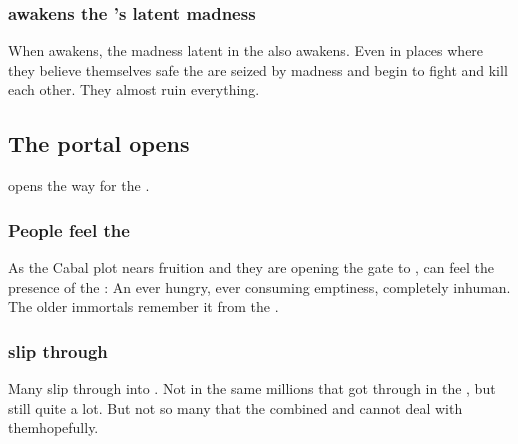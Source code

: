 \subsubsection{\Lithrim awakens the \resphain's latent madness}
When \Lithrim awakens, the madness latent in the \resphain also awakens. 
Even in places where they believe themselves safe the \resphain are seized by madness and begin to fight and kill each other.
They almost ruin everything. 










\subsection{The portal opens}
\Lithrim{} opens the way for the \Voidbringer. 






\subsubsection{People feel the \Voidbringer}
As the Cabal plot nears fruition and they are opening the gate to \Erebos, \Miithians can feel the presence of the \Voidbringer: 
An ever hungry, ever consuming emptiness, completely inhuman. 
The older immortals remember it from the \secondbanewar. 





\subsubsection{\Banes{} slip through}
Many \lesserbanes{} slip through into \Miith. 
Not in the same millions that got through in the \secondbanewar, but still quite a lot. 
But not so many that the combined \dragons{} and \resphain{} cannot deal with them\prikker hopefully. 

















